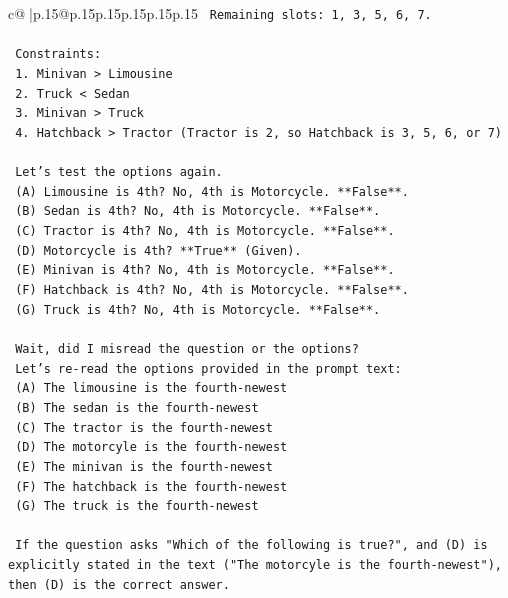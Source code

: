 \documentclass{article}
\begin{document}
{\begin{supertabular}{c@{$\;$}|p{.15\linewidth}@{}p{.15\linewidth}p{.15\linewidth}p{.15\linewidth}p{.15\linewidth}p{.15\linewidth}}
{{{\texttt{    Remaining slots: 1, 3, 5, 6, 7.} \\
\\ 
\texttt{    Constraints:} \\
\texttt{    1. Minivan > Limousine} \\
\texttt{    2. Truck < Sedan} \\
\texttt{    3. Minivan > Truck} \\
\texttt{    4. Hatchback > Tractor (Tractor is 2, so Hatchback is 3, 5, 6, or 7)} \\
\\ 
\texttt{    Let's test the options again.} \\
\texttt{    (A) Limousine is 4th? No, 4th is Motorcycle. **False**.} \\
\texttt{    (B) Sedan is 4th? No, 4th is Motorcycle. **False**.} \\
\texttt{    (C) Tractor is 4th? No, 4th is Motorcycle. **False**.} \\
\texttt{    (D) Motorcycle is 4th? **True** (Given).} \\
\texttt{    (E) Minivan is 4th? No, 4th is Motorcycle. **False**.} \\
\texttt{    (F) Hatchback is 4th? No, 4th is Motorcycle. **False**.} \\
\texttt{    (G) Truck is 4th? No, 4th is Motorcycle. **False**.} \\
\\ 
\texttt{    Wait, did I misread the question or the options?} \\
\texttt{    Let's re{-}read the options provided in the prompt text:} \\
\texttt{    (A) The limousine is the fourth{-}newest} \\
\texttt{    (B) The sedan is the fourth{-}newest} \\
\texttt{    (C) The tractor is the fourth{-}newest} \\
\texttt{    (D) The motorcyle is the fourth{-}newest} \\
\texttt{    (E) The minivan is the fourth{-}newest} \\
\texttt{    (F) The hatchback is the fourth{-}newest} \\
\texttt{    (G) The truck is the fourth{-}newest} \\
\\ 
\texttt{    If the question asks "Which of the following is true?", and (D) is explicitly stated in the text ("The motorcyle is the fourth{-}newest"), then (D) is the correct answer.} \\
}}}
\end{supertabular}}
\end{document}
